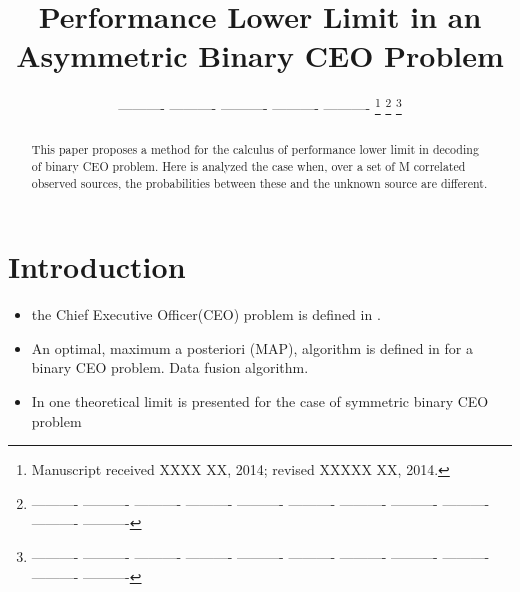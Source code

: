 \documentclass[journal]{IEEEtran}
\begin{document}
\title{Performance Lower Limit  in an Asymmetric Binary CEO Problem}


\author{---------- ---------- ---------- ---------- ---------- %
\thanks{Manuscript received XXXX XX, 2014; revised XXXXX XX, 2014.}
\thanks{---------- ---------- ---------- ---------- ---------- ---------- ---------- ---------- ---------- ---------- ---------- }%
\thanks{---------- ---------- ---------- ---------- ---------- ---------- ---------- ---------- ---------- ---------- ---------- }}%


\maketitle


\begin{abstract}
This paper proposes a method for the calculus of performance lower limit in 
decoding of binary CEO problem. 
Here is analyzed the case when,  over a set of M correlated observed sources, the 
probabilities between these and the unknown source are different.

\end{abstract}


\IEEEpeerreviewmaketitle
\section{Introduction}
\label{sec:Intro}

\begin{itemize}
 \item the Chief Executive Officer(CEO) problem is defined in \cite{ceooriginal}.
 \item An optimal, maximum a posteriori (MAP), algorithm is defined in \cite{optimal} for a 
binary CEO  problem. Data fusion algorithm.
 \item In \cite{ceobinary1,ceobinary2} one theoretical limit is presented for
the case of symmetric binary CEO problem
\end{itemize}
\end{document}
